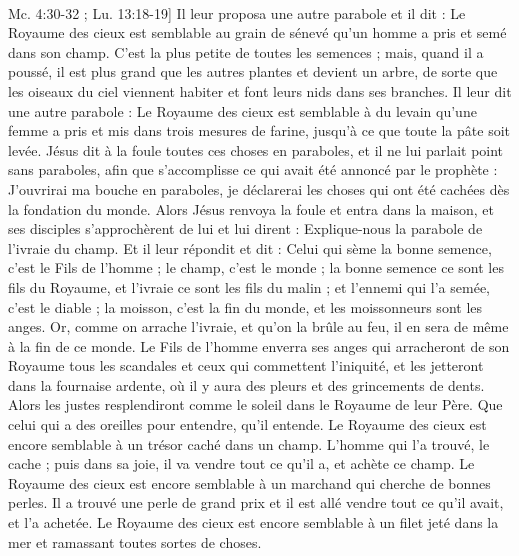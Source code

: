 \begin{multicols}{2}
{\\Mc. 4:30-32 ; Lu. 13:18-19]}
Il leur proposa une autre parabole et il dit : Le Royaume des cieux est semblable au grain de sénevé qu’un homme a pris et semé dans son champ.
C’est la plus petite de toutes les semences ; mais, quand il a poussé, il est plus grand que les autres plantes et devient un arbre, de sorte que les oiseaux du ciel viennent habiter et font leurs nids dans ses branches.
Il leur dit une autre parabole : Le Royaume des cieux est semblable à du levain qu'une femme a pris et mis dans trois mesures de farine, jusqu'à ce que toute la pâte soit levée.
Jésus dit à la foule toutes ces choses en paraboles, et il ne lui parlait point sans paraboles,
afin que s’accomplisse ce qui avait été annoncé par le prophète : J'ouvrirai ma bouche en paraboles, je déclarerai les choses qui ont été cachées dès la fondation du monde{}.
Alors Jésus renvoya la foule et entra dans la maison, et ses disciples s’approchèrent de lui et lui dirent : Explique-nous la parabole de l'ivraie du champ.
Et il leur répondit et dit : Celui qui sème la bonne semence, c'est le Fils de l'homme ;
le champ, c'est le monde ; la bonne semence ce sont les fils du Royaume, et l'ivraie ce sont les fils du malin ;
et l'ennemi qui l'a semée, c'est le diable ; la moisson, c'est la fin du monde, et les moissonneurs sont les anges.
Or, comme on arrache l'ivraie, et qu’on la brûle au feu, il en sera de même à la fin de ce monde.
Le Fils de l'homme enverra ses anges qui arracheront de son Royaume tous les scandales et ceux qui commettent l'iniquité,
et les jetteront dans la fournaise ardente, où il y aura des pleurs et des grincements de dents.
Alors les justes resplendiront comme le soleil dans le Royaume de leur Père. Que celui qui a des oreilles pour entendre, qu'il entende.
Le Royaume des cieux est encore semblable à un trésor caché dans un champ. L’homme qui l’a trouvé, le cache ; puis dans sa joie, il va vendre tout ce qu'il a, et achète ce champ.
Le Royaume des cieux est encore semblable à un marchand qui cherche de bonnes perles.
Il a trouvé une perle de grand prix et il est allé vendre tout ce qu'il avait, et l'a achetée.
Le Royaume des cieux est encore semblable à un filet jeté dans la mer et ramassant toutes sortes de choses.

\end{multicols}
